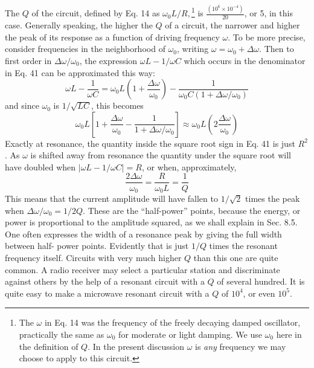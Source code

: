 The $Q$ of the circuit, defined by Eq. 14
as $\omega_0L/R,$\footnote{The $\omega$ in Eq. 14 was the frequency of the
freely decaying damped oscillator, practically
the same as $\omega_0$ for moderate or light damping. We use $\omega_0$ here in the definition
of $Q$. In the present discussion $\omega$ is \emph{any} frequency we may choose to apply to this circuit.
}
is $\frac{(10^{6}\times10^{-4})}{20}$, or 5, in this case.
Generally speaking, the higher the $Q$ of a circuit,
the narrower and higher the peak of its response as a function of
driving frequency $\omega$. To be more precise, consider frequencies in
the neighborhood of $\omega_0$, writing $\omega = \omega_0 + \Delta\omega$. Then to first order
in $\Delta\omega/\omega_0$, the expression 
$\omega L - 1/\omega C$ which occurs in the 
denominator in Eq. 41 can be approximated this way:
\begin{equation}
  \omega L-\frac{1}{\omega C} = \omega_0 L \left(1+\frac{\Delta\omega}{\omega_0}\right)
          - \frac{1}{\omega_0 C(1+\Delta\omega/\omega_0)}
\end{equation}
and since $\omega_0$ is $1/\sqrt{LC}$, this becomes
\begin{equation}
  \omega_0 L \left[1+\frac{\Delta\omega}{\omega_0}-\frac{1}{1+\Delta\omega/\omega_0}\right]
    \approx \omega_0 L\left(2\frac{\Delta\omega}{\omega_0}\right)
\end{equation}
Exactly at resonance, the quantity inside the square root sign in
Eq. 41 is just $R^2$. As $\omega$ is shifted away from resonance the quantity
under the square root will have doubled when $|\omega L - 1/\omega C| = R$,
or when, approximately,
\begin{equation}
  \frac{2\Delta\omega}{\omega_0} = \frac{R}{\omega_0 L} = \frac{1}{Q}
\end{equation}
This means that the current amplitude will have fallen to $1/\sqrt{2}$ times
the peak when $\Delta\omega/\omega_0 = 1/2Q$. These are the ``half-power'' points,
because the energy, or power is proportional to the amplitude
squared, as we shall explain in Sec. 8.5. One often expresses the
width of a resonance peak by giving the full width between half-
power points. Evidently that is just $1/ Q$ times the resonant frequency
itself. Circuits with very much higher $Q$ than this one are
quite common. A radio receiver may select a particular station and
discriminate against others by the help of a resonant circuit with a $Q$
of several hundred. It is quite easy to make a microwave resonant
circuit with a $Q$ of $10^4$, or even $10^5$.

